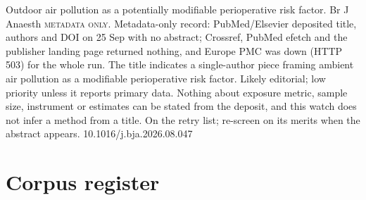 \documentclass[10pt]{article}
\begin{document}

{Outdoor air pollution as a potentially modifiable perioperative risk factor.}
{Br J Anaesth}
{\textsc{metadata only.} Metadata-only record: PubMed/Elsevier deposited title, authors and DOI on 25 Sep with no abstract; Crossref, PubMed efetch and the publisher landing page returned nothing, and Europe PMC was down (HTTP 503) for the whole run. The title indicates a single-author piece framing ambient air pollution as a modifiable perioperative risk factor. Likely editorial; low priority unless it reports primary data. Nothing about exposure metric, sample size, instrument or estimates can be stated from the deposit, and this watch does not infer a method from a title. On the retry list; re-screen on its merits when the abstract appears.}
{10.1016/j.bja.2026.08.047}

\clearpage
\section*{\sffamily\bfseries\color{Deep}Corpus register}
\vspace{-1.5mm}{\color{Amber}\rule{\linewidth}{1.1pt}}\vspace{2.5mm}



\vspace{2mm}
\end{document}
